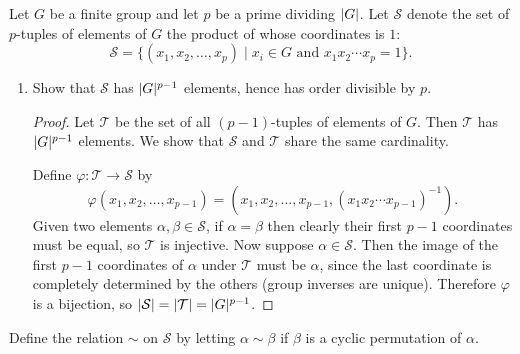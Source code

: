  Let $G$ be a finite group and let $p$ be a prime dividing
$\lvert{G}\rvert$. Let $\mathcal{S}$ denote the set of $p$-tuples of elements
of $G$ the product of whose coordinates is $1$:
\begin{equation*}
  \mathcal{S} = \{(x_1,x_2,\dots,x_p) \mid
  \text{$x_i\in G$ and $x_1x_2\cdots x_p = 1$}\}.
\end{equation*}
\begin{enumerate}
\item Show that $\mathcal{S}$ has $\lvert{G}\rvert^{p-1}$ elements, hence has
  order divisible by $p$.
  \begin{proof}
    Let $\mathcal{T}$ be the set of all $(p-1)$-tuples of elements of
    $G$. Then $\mathcal{T}$ has $\lvert{G}\rvert^{p-1}$ elements. We show that
    $\mathcal{S}$ and $\mathcal{T}$ share the same cardinality.

    Define $\varphi\colon\mathcal{T}\to\mathcal{S}$ by
    \begin{equation*}
      \varphi(x_1,x_2,\dots,x_{p-1})
      = (x_1,x_2,\dots,x_{p-1},(x_1x_2\cdots x_{p-1})^{-1}).
    \end{equation*}
    Given two elements $\alpha,\beta\in\mathcal{S}$, if
    $\alpha = \beta$ then clearly their first $p-1$ coordinates must
    be equal, so $\mathcal{T}$ is injective. Now suppose
    $\alpha\in\mathcal{S}$. Then the image of the first $p-1$
    coordinates of $\alpha$ under $\mathcal{T}$ must be $\alpha$,
    since the last coordinate is completely determined by the others
    (group inverses are unique). Therefore $\varphi$ is a bijection,
    so $\lvert{\mathcal{S}}\rvert = \lvert{\mathcal{T}}\rvert = \lvert{G}\rvert^{p-1}$.
  \end{proof}
\end{enumerate}
Define the relation $\sim$ on $\mathcal{S}$ by letting
$\alpha\sim\beta$ if $\beta$ is a cyclic permutation of $\alpha$.
